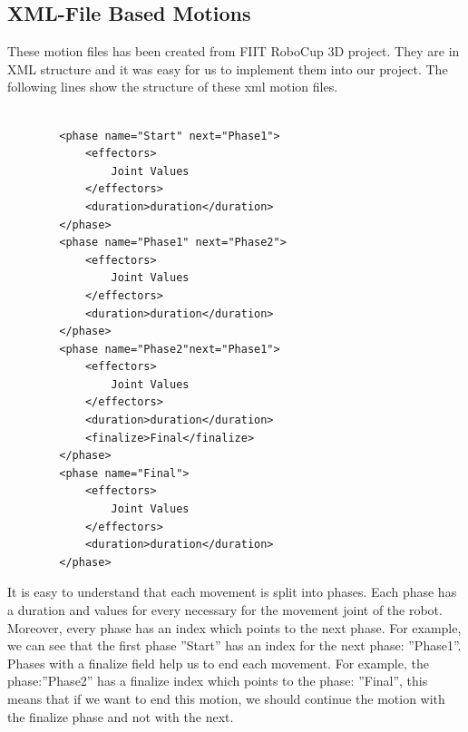 \subsection{XML-File Based Motions}
These motion files has been created from FIIT RoboCup 3D project. They are in XML structure and it was easy for us to implement them into our project. The following lines show the structure of these xml motion files.
\begin{verbatim}

		<phase name="Start" next="Phase1">
			<effectors>
				Joint Values
			</effectors>
			<duration>duration</duration>
		</phase>
		<phase name="Phase1" next="Phase2">
			<effectors>
				Joint Values
			</effectors>
			<duration>duration</duration>
		</phase>
		<phase name="Phase2"next="Phase1">
			<effectors>
				Joint Values
			</effectors>
			<duration>duration</duration>
			<finalize>Final</finalize>
		</phase>
		<phase name="Final">
			<effectors>
				Joint Values
			</effectors>
			<duration>duration</duration>
		</phase>

\end{verbatim}
It is easy to understand that each movement is split into phases. Each phase has a duration and values for every necessary for the movement joint of the robot. Moreover, every phase has an index which points to the next phase. For example, we can see that the first phase ''Start'' has an index for the next phase: ''Phase1''. Phases with a finalize field help us to end each movement. For example, the phase:''Phase2'' has a finalize index which points to the phase: ''Final'', this means that if we want to end this motion, we should continue the motion with the finalize phase and not with the next.
